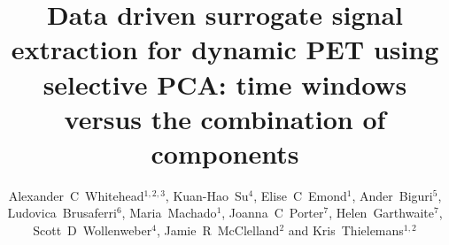 \documentclass[12pt]{iopart}
\begin{document}
    \title[Data driven surrogate signal extraction for dynamic PET using selective PCA]{Data driven surrogate signal extraction for dynamic PET using selective PCA: time windows versus the combination of components}
    
    \author{Alexander~C~Whitehead$^{1, 2, 3}$, Kuan-Hao~Su$^4$, Elise~C~Emond$^1$, Ander~Biguri$^5$, Ludovica~Brusaferri$^6$, Maria~Machado$^1$, Joanna~C~Porter$^7$, Helen~Garthwaite$^7$, Scott~D~Wollenweber$^4$, Jamie~R~McClelland$^2$ and Kris~Thielemans$^{1, 2}$}
    
    \address{$^1$ Institute of Nuclear Medicine, University College London, UK}
    \address{$^2$ Centre for Medical Image Computing, University College London, UK}
    \address{$^3$ Department of Computer Science, University College London, UK}
    \address{$^4$ Molecular Imaging and Computed Tomography Engineering, GE Healthcare, USA}
    \address{$^5$ Department of Applied Mathematics and Theoretical Physics, University of Cambridge, UK}
    \address{$^6$ Computer Science and Informatics, London South Bank University, UK}
    \address{$^7$ Centre for Respiratory Medicine, University College London, UK}
    
    
\end{document}
